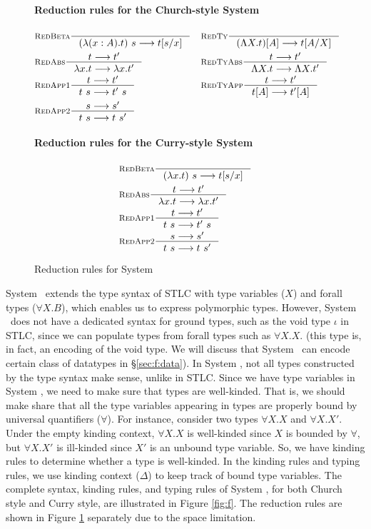 \begin{figure}
\paragraph{Reduction rules for the Church-style System \F}
\begin{align*}
& \inference[\sc RedBeta]{}{(\l(x:A).t)~s --> t[s/x]}
&&\inference[\sc RedTy]{}{(\L X   .t)[A] --> t[A/X]} \\
& \inference[\sc RedAbs]{t --> t'}{\l x   .t --> \l x   .t'}
&&\inference[\sc RedTyAbs]{t --> t'}{\L X   .t --> \L X   .t'} \\
& \inference[\sc RedApp1]{t --> t'}{t~s --> t'~s}
&&\inference[\sc RedTyApp]{t --> t'}{t[A] --> t'[A]} \\
& \inference[\sc RedApp2]{s --> s'}{t~s --> t~s'}
\end{align*}
\paragraph{Reduction rules for the Curry-style System \F}
\begin{align*}
& \inference[\sc RedBeta]{}{(\l x   .t)~s --> t[s/x]} \\
& \inference[\sc RedAbs]{t --> t'}{\l x   .t --> \l x   .t'} \\
& \inference[\sc RedApp1]{t --> t'}{t~s --> t'~s} \\
& \inference[\sc RedApp2]{s --> s'}{t~s --> t~s'}
\end{align*}
\caption{Reduction rules for System \F}
\label{fig:redf}
\end{figure}

System \F\ extends the type syntax of STLC with type variables ($X$) and
forall types ($\forall X.B$), which enables us to express polymorphic types.
However, System \F\ does not have a dedicated syntax for ground types,
such as the void type $\iota$ in STLC, since we can populate types from
forall types such as $\forall X.X$. (this type is, in fact, an encoding of
the void type. We will discuss that System \F\ can encode certain class of
datatypes in \S\ref{sec:f:data}). In System \F, not all types constructed by
the type syntax make sense, unlike in STLC. Since we have type variables
in System \F, we need to make sure that types are well-kinded. That is,
we should make share that all the type variables appearing in types are
properly bound by universal quantifiers ($\forall$). For instance, consider
two types $\forall X.X$ and $\forall X.X'$. Under the empty kinding context,
$\forall X.X$ is well-kinded since $X$ is bounded by $\forall$, but
$\forall X.X'$ is ill-kinded since $X'$ is an unbound type variable.
So, we have kinding rules to determine whether a type is well-kinded.
In the kinding  rules and typing rules, we use kinding context ($\Delta$)
to keep track of bound type variables. The complete syntax, kinding rules,
and typing rules of System \F, for both Church style and Curry style, are
illustrated in Figure \ref{fig:f}. The reduction rules are shown
in Figure \ref{fig:redf} separately due to the space limitation.

